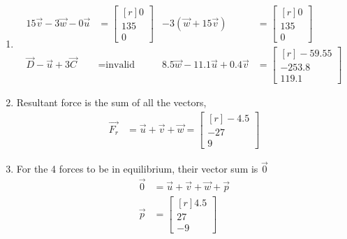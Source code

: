 \begin{enumerate}
    \item  \begin{align}
              15\vec{v} - 3\vec{w} - 0\vec{u}       & = \begin{bmatrix*}[r]
                                                            0 \\ 135 \\ 0
                                                        \end{bmatrix*}     &
              -3 (\vec{w} + 15\vec{v})              & = \begin{bmatrix*}[r]
                                                            0 \\ 135 \\ 0
                                                        \end{bmatrix*}        \\
              \vec{D} - \vec{u} + 3\vec{C}          & = \text{invalid}          &
              8.5\vec{w} - 11.1\vec{u} + 0.4\vec{v} & = \begin{bmatrix*}[r]
                                                            -59.55 \\ -253.8 \\ 119.1
                                                        \end{bmatrix*}
          \end{align}

    \item Resultant force is the sum of all the vectors,
          \begin{align}
              \vec{F_r} & = \vec{u} + \vec{v} + \vec{w} = \begin{bmatrix*}[r]
                                                              -4.5 \\ -27 \\ 9
                                                          \end{bmatrix*}
          \end{align}

    \item For the 4 forces to be in equilibrium, their vector sum is $ \vec{0} $
          \begin{align}
              \vec{0} & = \vec{u} + \vec{v} + \vec{w} + \vec{p} \\
              \vec{p} & = \begin{bmatrix*}[r]
                              4.5 \\ 27 \\ -9
                          \end{bmatrix*}
          \end{align}


\end{enumerate}
